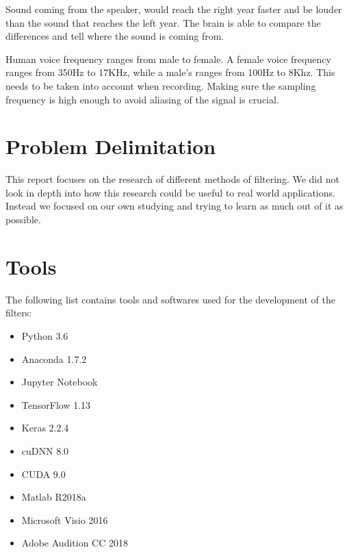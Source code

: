 Sound coming from the speaker, would reach  the right year faster and be louder than 
the sound that reaches the left year. The brain is able to compare the differences
and tell where the sound is coming from.

Human voice frequency ranges from male to female. A female voice frequency ranges from 
350Hz to 17KHz, while a male's ranges from 100Hz to 8Khz. This needs to be taken into
account when recording. Making sure the sampling frequency is high enough to avoid 
aliasing of the signal is crucial.\cite{VOICEFREQUENCY}
\newpage
\section{Problem Delimitation}
This report focuses on the research of different methods of filtering. We did not
look in depth into how this research could be useful to real world applications. Instead we 
focused on our own studying and trying to learn as much out of it as possible.
\section{Tools}
The following list contains tools and softwares used for the development of the filters:
\begin{itemize}
\item Python 3.6
\item Anaconda 1.7.2
\item Jupyter Notebook
\item TensorFlow 1.13
\item Keras 2.2.4
\item cuDNN 8.0
\item CUDA 9.0
\item Matlab R2018a
\item Microsoft Visio 2016
\item Adobe Audition CC 2018
\end{itemize}